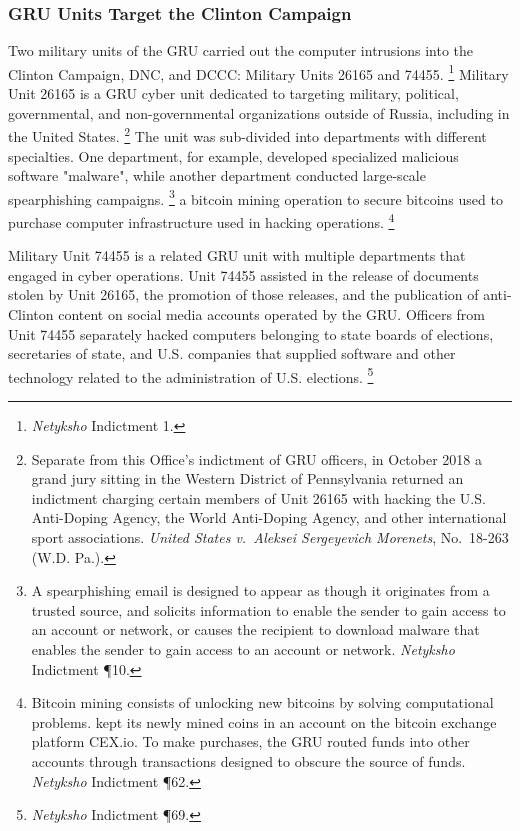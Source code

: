 \subsubsection{GRU Units Target the Clinton Campaign}

Two military units of the GRU carried out the computer intrusions into the Clinton Campaign, DNC, and DCCC: Military Units 26165 and 74455.%
\footnote{\textit{Netyksho} Indictment 1.}
Military Unit 26165 is a GRU cyber unit dedicated to targeting military, political, governmental, and non-governmental organizations outside of Russia, including in the United States.%
\footnote{Separate from this Office's indictment of GRU officers, in October 2018 a grand jury sitting in the Western District of Pennsylvania returned an indictment charging certain members of Unit 26165 with hacking the U.S. Anti-Doping Agency, the World Anti-Doping Agency, and other international sport associations.
\textit{United States v.\ Aleksei Sergeyevich Morenets}, No.~18-263 (W.D. Pa.).}
The unit was sub-divided into departments with different specialties.
One department, for example, developed specialized malicious software "malware", while another department conducted large-scale spearphishing campaigns.%
\footnote{A spearphishing email is designed to appear as though it originates from a trusted source, and solicits information to enable the sender to gain access to an account or network, or causes the recipient to download malware that enables the sender to gain access to an account or network.
\textit{Netyksho} Indictment \P 10.}
 a bitcoin mining operation to secure bitcoins used to purchase computer infrastructure used in hacking operations.%
\footnote{Bitcoin mining consists of unlocking new bitcoins by solving computational problems.
 kept its newly mined coins in an account on the bitcoin exchange platform CEX.io.
To make purchases, the GRU routed funds into other accounts through transactions designed to obscure the source
of funds.
\textit{Netyksho} Indictment \P 62.}

Military Unit 74455 is a related GRU unit with multiple departments that engaged in cyber operations.
Unit 74455 assisted in the release of documents stolen by Unit 26165, the promotion of those releases, and the publication of anti-Clinton content on social media accounts operated by the GRU\null.
Officers from Unit 74455 separately hacked computers belonging to state boards of elections, secretaries of state, and U.S. companies that supplied software and other technology related to the administration of U.S. elections.%
\footnote{\textit{Netyksho} Indictment \P 69.}

